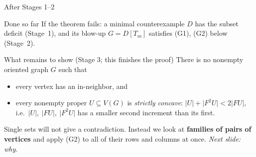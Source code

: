 \documentclass[aspectratio=169,11pt]{beamer}
\newcommand{\abs}[1]{\lvert #1\rvert}
\begin{document}
\begin{frame}{After Stages 1--2}
\begin{block}{Done so far}
If the theorem fails: a minimal counterexample $D$ has the subset deficit
(Stage~1), and its blow-up $G=D[T_m]$ satisfies (G1), (G2) below (Stage~2).
\end{block}
\begin{alertblock}{What remains to show (Stage 3; this finishes the proof)}
There is no nonempty oriented graph $G$ such that
\begin{itemize}
\item[(G1)] every vertex has an in-neighbor, and
\item[(G2)] every nonempty proper $U\subseteq V(G)$ is \emph{strictly concave}:
$\abs U+\abs{F^2U}<2\abs{FU}$,\\ i.e.\ $\abs U,\ \abs{FU},\ \abs{F^2U}$ has
a smaller second increment than its first.
\end{itemize}
\end{alertblock}
Single sets will not give a contradiction. Instead we look at
\textbf{families of pairs of vertices} and apply (G2) to all of their
rows and columns at once. \emph{Next slide: why.}
\end{frame}
\end{document}
